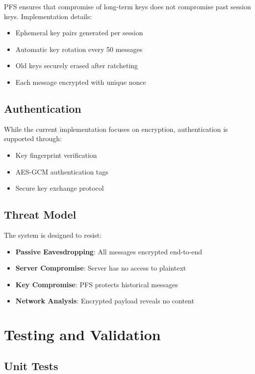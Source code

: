 \documentclass[12pt,a4paper]{article}
\begin{document}
PFS ensures that compromise of long-term keys does not compromise past session keys. Implementation details:

\begin{itemize}
    \item Ephemeral key pairs generated per session
    \item Automatic key rotation every 50 messages
    \item Old keys securely erased after ratcheting
    \item Each message encrypted with unique nonce
\end{itemize}

\subsection{Authentication}

While the current implementation focuses on encryption, authentication is supported through:

\begin{itemize}
    \item Key fingerprint verification
    \item AES-GCM authentication tags
    \item Secure key exchange protocol
\end{itemize}

\subsection{Threat Model}

The system is designed to resist:

\begin{itemize}
    \item \textbf{Passive Eavesdropping}: All messages encrypted end-to-end
    \item \textbf{Server Compromise}: Server has no access to plaintext
    \item \textbf{Key Compromise}: PFS protects historical messages
    \item \textbf{Network Analysis}: Encrypted payload reveals no content
\end{itemize}

\section{Testing and Validation}

\subsection{Unit Tests}
\end{document}
